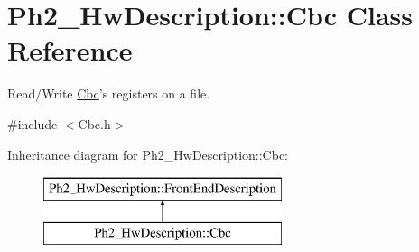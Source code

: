 \hypertarget{class_ph2___hw_description_1_1_cbc}{\section{Ph2\-\_\-\-Hw\-Description\-:\-:Cbc Class Reference}
\label{class_ph2___hw_description_1_1_cbc}
}


Read/\-Write \hyperlink{class_ph2___hw_description_1_1_cbc}{Cbc}'s registers on a file.  




{\ttfamily \#include $<$Cbc.\-h$>$}

Inheritance diagram for Ph2\-\_\-\-Hw\-Description\-:\-:Cbc\-:\begin{figure}[H]
\begin{center}
\leavevmode
\includegraphics[height=2.000000cm]{class_ph2___hw_description_1_1_cbc}
\end{center}
\end{figure}
